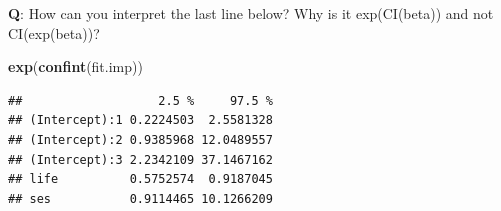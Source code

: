 \documentclass[
  ignorenonframetext,
]{beamer}
\newenvironment{Shaded}{\begin{snugshade}}{\end{snugshade}}
\newcommand{\FunctionTok}[1]{\textcolor[rgb]{0.13,0.29,0.53}{\textbf{#1}}}
\newcommand{\NormalTok}[1]{#1}
\begin{document}
\begin{frame}[fragile]
\textbf{Q}: How can you interpret the last line below? Why is it
exp(CI(beta)) and not CI(exp(beta))?

\begin{Shaded}
\begin{Highlighting}[]
\FunctionTok{exp}\NormalTok{(}\FunctionTok{confint}\NormalTok{(fit.imp))}
\end{Highlighting}
\end{Shaded}

\begin{verbatim}
##                   2.5 %     97.5 %
## (Intercept):1 0.2224503  2.5581328
## (Intercept):2 0.9385968 12.0489557
## (Intercept):3 2.2342109 37.1467162
## life          0.5752574  0.9187045
## ses           0.9114465 10.1266209
\end{verbatim}
\end{frame}
\end{document}
